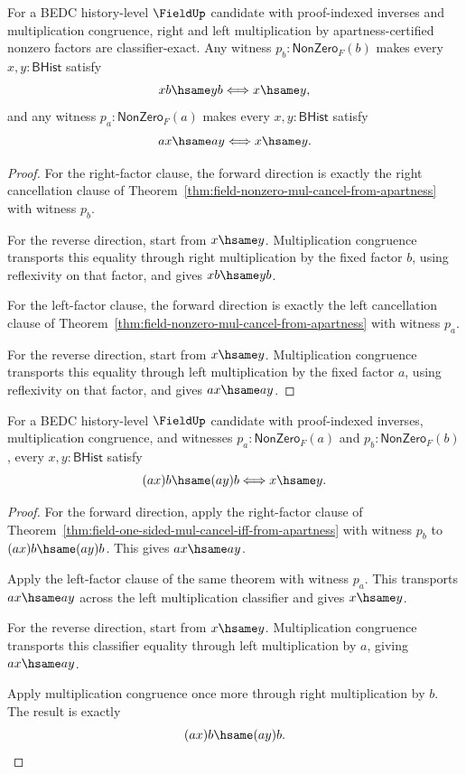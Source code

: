 \begin{theorem}
\label{thm:field-one-sided-mul-cancel-iff-from-apartness}
For a BEDC history-level $\FieldUp$ candidate with proof-indexed inverses and
multiplication congruence, right and left multiplication by apartness-certified
nonzero factors are classifier-exact. Any witness
$p_b:\mathsf{NonZero}_F(b)$ makes every $x,y:\mathsf{BHist}$ satisfy
$$
xb\hsame yb
\Longleftrightarrow
x\hsame y,
$$
and any witness $p_a:\mathsf{NonZero}_F(a)$ makes every
$x,y:\mathsf{BHist}$ satisfy
$$
ax\hsame ay
\Longleftrightarrow
x\hsame y.
$$
\end{theorem}
\begin{proof}
For the right-factor clause, the forward direction is exactly the right
cancellation clause of
Theorem~\ref{thm:field-nonzero-mul-cancel-from-apartness} with witness $p_b$.

For the reverse direction, start from $x\hsame y$. Multiplication congruence
transports this equality through right multiplication by the fixed factor $b$,
using reflexivity on that factor, and gives $xb\hsame yb$.

For the left-factor clause, the forward direction is exactly the left
cancellation clause of
Theorem~\ref{thm:field-nonzero-mul-cancel-from-apartness} with witness $p_a$.

For the reverse direction, start from $x\hsame y$. Multiplication congruence
transports this equality through left multiplication by the fixed factor $a$,
using reflexivity on that factor, and gives $ax\hsame ay$.
\end{proof}

\begin{theorem}
\label{thm:field-two-sided-mul-exact-from-apartness}
For a BEDC history-level $\FieldUp$ candidate with proof-indexed inverses,
multiplication congruence, and witnesses $p_a:\mathsf{NonZero}_F(a)$ and
$p_b:\mathsf{NonZero}_F(b)$, every $x,y:\mathsf{BHist}$ satisfy
$$
(a x)b\hsame(a y)b
\Longleftrightarrow
x\hsame y.
$$
\end{theorem}
\begin{proof}
For the forward direction, apply the right-factor clause of
Theorem~\ref{thm:field-one-sided-mul-cancel-iff-from-apartness} with witness
$p_b$ to $(a x)b\hsame(a y)b$. This gives $a x\hsame a y$.

Apply the left-factor clause of the same theorem with witness $p_a$. This
transports $a x\hsame a y$ across the left multiplication classifier and gives
$x\hsame y$.

For the reverse direction, start from $x\hsame y$. Multiplication congruence
transports this classifier equality through left multiplication by $a$, giving
$a x\hsame a y$.

Apply multiplication congruence once more through right multiplication by $b$.
The result is exactly
$$
(a x)b\hsame(a y)b.
$$
\end{proof}

